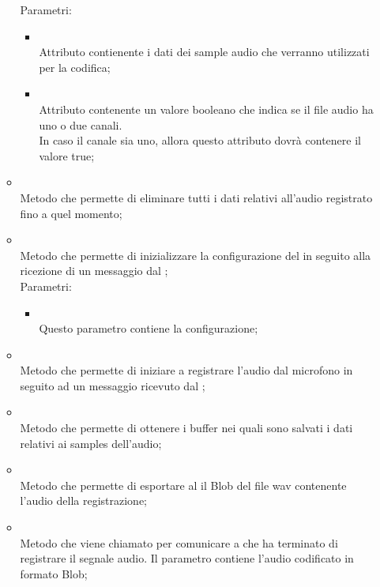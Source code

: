 \begin{itemize}
\begin{itemize}
		Parametri:
		\begin{itemize}
			\item {} \\
			Attributo contienente i dati dei sample audio che verranno utilizzati per la codifica;
			\item {} \\
			Attributo contenente un valore booleano che indica se il file audio ha uno o due canali. \\
			In caso il canale sia uno, allora questo attributo dovrà contenere il valore true;
		\end{itemize}
		\item[]  \\		Metodo che permette di eliminare tutti i dati relativi all'audio registrato fino a quel momento;\\
		\item[]  \\		Metodo che permette di inizializzare la configurazione del  in seguito alla ricezione di un messaggio dal ;\\
		Parametri:
		\begin{itemize}
			\item {} \\
			Questo parametro contiene la configurazione;
		\end{itemize}
		\item[]  \\		Metodo che permette di iniziare a registrare l'audio dal microfono in seguito ad un messaggio ricevuto dal ;\\
		\item[]  \\		Metodo che permette di ottenere i buffer nei quali sono salvati i dati relativi ai samples dell'audio;\\
		\item[]  \\		Metodo che permette di esportare al  il Blob del file wav contenente l'audio della registrazione;\\
		\item[]  \\		Metodo che viene chiamato per comunicare a  che ha terminato di registrare il segnale audio. Il parametro contiene l'audio codificato in formato Blob;\\

\end{itemize}
\end{itemize}
